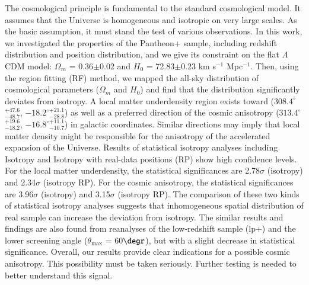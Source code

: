 \documentclass{aa}
\def\tm{$\theta_\mathrm{max}$ }
\begin{document}
  \abstract
   {The cosmological principle is fundamental to the standard cosmological model. It assumes that the Universe is homogeneous and isotropic on very large scales. As the basic assumption, it must stand the test of various observations. In this work, we investigated the properties of the Pantheon+ sample, including redshift distribution and position distribution, and we give its constraint on the flat $\Lambda$CDM model: $\Omega_{m}$ = 0.36$\pm$0.02 and $H_{0}$ = 72.83$\pm$0.23 km s$^{-1}$ Mpc$^{-1}$. Then, using the region fitting (RF) method, we mapped the all-sky distribution of cosmological parameters ($\Omega_{m}$ and $H_{0}$) and find that the distribution significantly deviates from isotropy. A local matter underdensity region exists toward (${308.4^{\circ}}$$_{-48.7}^{+47.6}$, ${-18.2^{\circ}}$$_{-28.8}^{+21.1}$) as well as a preferred direction of the cosmic anisotropy (${313.4^{\circ}}$$_{-18.2}^{+19.6}$, ${-16.8^{\circ}}$$_{-10.7}^{+11.1}$) in galactic coordinates. Similar directions may imply that local matter density might be responsible for the anisotropy of the accelerated expansion of the Universe. Results of statistical isotropy analyses including Isotropy and Isotropy with real-data positions (RP) show high confidence levels. For the local matter underdensity, the statistical significances are 2.78$\sigma$ (isotropy) and 2.34$\sigma$ (isotropy RP). For the cosmic anisotropy, the statistical significances are 3.96$\sigma$ (isotropy) and 3.15$\sigma$ (isotropy RP). The comparison of these two kinds of statistical isotropy analyses suggests that inhomogeneous spatial distribution of real sample can increase the deviation from isotropy. The similar results and findings are also found from reanalyses of the low-redshift sample (lp+) and the lower screening angle (\tm = 60$\degr$), but with a slight decrease in statistical significance. Overall, our results provide clear indications for a possible cosmic anisotropy. This possibility must be taken seriously. Further testing is needed to better understand this signal. }

\maketitle


%
\end{document}
